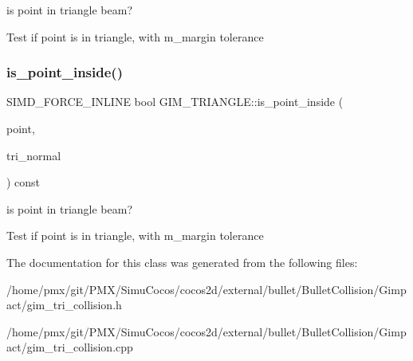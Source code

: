 is point in triangle beam? 

Test if point is in triangle, with m\+\_\+margin tolerance \mbox{\label{classGIM__TRIANGLE_ac465430340164aa45925762d3471b5f8}} 
\subsubsection{\texorpdfstring{is\+\_\+point\+\_\+inside()}{is\_point\_inside()}\hspace{0.1cm}{\footnotesize\ttfamily [2/2]}}
{\footnotesize\ttfamily S\+I\+M\+D\+\_\+\+F\+O\+R\+C\+E\+\_\+\+I\+N\+L\+I\+NE bool G\+I\+M\+\_\+\+T\+R\+I\+A\+N\+G\+L\+E\+::is\+\_\+point\+\_\+inside (\begin{DoxyParamCaption}\item[{const bt\+Vector3 \&}]{point,  }\item[{const bt\+Vector3 \&}]{tri\+\_\+normal }\end{DoxyParamCaption}) const\hspace{0.3cm}{\ttfamily [inline]}}



is point in triangle beam? 

Test if point is in triangle, with m\+\_\+margin tolerance 

The documentation for this class was generated from the following files\+:\begin{DoxyCompactItemize}
\item 
/home/pmx/git/\+P\+M\+X/\+Simu\+Cocos/cocos2d/external/bullet/\+Bullet\+Collision/\+Gimpact/gim\+\_\+tri\+\_\+collision.\+h\item 
/home/pmx/git/\+P\+M\+X/\+Simu\+Cocos/cocos2d/external/bullet/\+Bullet\+Collision/\+Gimpact/gim\+\_\+tri\+\_\+collision.\+cpp\end{DoxyCompactItemize}
